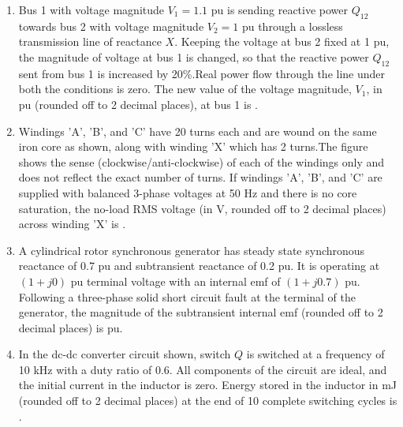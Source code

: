 \documentclass[journal,12pt,onecolumn]{IEEEtran}
\theoremstyle{remark}
\begin{document}
\begin{enumerate}
    \item Bus 1 with voltage magnitude $V_1=1.1$ pu is sending reactive power $Q_{12}$ towards bus 2 with voltage magnitude $V_2 =1$ pu through a lossless transmission line of reactance $X$. Keeping the voltage at bus 2 fixed at 1 pu, the magnitude of voltage at bus 1 is changed, so that the reactive power $Q_{12}$ sent from bus 1 is increased by 20\%.Real power flow through the line under both the conditions is zero. The new value of the voltage magnitude, $V_1$, in pu  (rounded off to 2 decimal places), at bus 1 is {\underline{\hspace{2cm}}}.
          \begin{figure}[H]
        \centering
    \end{figure}
       
   
    \item Windings 'A', 'B', and 'C' have 20 turns each and are wound on the same iron core as shown, along with winding 'X' which has 2 turns.The figure shows the sense (clockwise/anti-clockwise) of each of the windings only and does not reflect the exact number of turns. If windings 'A', 'B', and 'C' are supplied with balanced 3-phase voltages at 50 Hz and there is no core saturation, the no-load RMS voltage (in V, rounded off to 2 decimal places) across winding 'X' is {\underline{\hspace{2cm}}}.
     \begin{figure}[H]
        \centering
    \end{figure}
    

    \item A cylindrical rotor synchronous generator has steady state synchronous reactance of 0.7 pu and subtransient reactance of 0.2 pu. It is operating at $(1 +j0)$ pu terminal voltage with an internal emf of $(1+j0.7)$ pu. Following a three-phase solid short circuit fault at the terminal of the generator, the magnitude of the subtransient internal emf (rounded off to 2 decimal places) is {\underline{\hspace{2cm}}} pu.
    
    \item In the dc-dc converter circuit shown, switch $Q$ is switched at a frequency of 10 kHz with a duty ratio of 0.6. All components of the circuit are ideal, and the initial current in the inductor is zero. Energy stored in the inductor in mJ (rounded off to 2 decimal places) at the end of 10 complete switching cycles is {\underline{\hspace{2cm}}}.
  

\end{enumerate}
\end{document}
